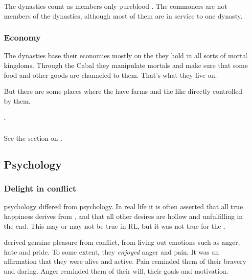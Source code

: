 The dynasties count as members only pureblood \resphain{}. 
The \ashenblooded{} commoners are not members of the dynasties, although most of them are in service to one dynasty. 





\subsubsection{Economy}
The \resphan{} dynasties base their economies mostly on the  they hold in all sorts of mortal kingdoms. 
Through the Cabal they manipulate mortals and make sure that some food and other goods are channeled to them. 
That's what they live on. 

But there are some places where the \resphan{} have farms and the like directly controlled by them. 

.





\subsubsection{\Noggyaleth}
See the section on . 









\subsection{Psychology}





\subsubsection{Delight in conflict}
\Resphan psychology differed from \human psychology.
In real life it is often asserted that all true happiness derives from , and that all other desires are hollow and unfulfilling in the end.
This may or may not be true in RL, but it was not true for the \resphain.

\Resphain derived genuine pleasure from conflict, from living out  emotions such as anger, hate and pride.
To some extent, they \emph{enjoyed} anger and pain.
It was an affirmation that they were alive and active.
Pain reminded them of their bravery and daring.
Anger reminded them of their will, their goals and motivation.

